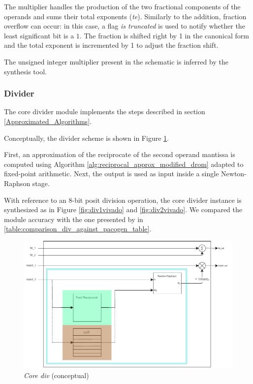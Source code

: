 The multiplier handles the production of the two fractional components of the operands and sums their total exponents (\textit{te}). Similarly to the addition, fraction overflow can occur: in this case, a flag \textit{is truncated} is used to notify whether the least significant bit is a $1$. The fraction is shifted right by 1 in the canonical form and the total exponent is incremented by 1 to adjust the fraction shift.

The unsigned integer multiplier present in the schematic is inferred by the synthesis tool. 
%





\subsubsection{Divider}\label{divider_hardware_ppu}


The core divider module implements the steps described in section \ref{Approximated_Algorithms}.

Conceptually, the divider scheme is shown in Figure \ref{fig:nr_schematic}.

First, an approximation of the reciprocate of the second operand mantissa is computed using Algorithm \ref{alg:reciprocal_approx_modified_drom} adapted to fixed-point arithmetic.
Next, the output is used as input inside a single Newton-Raphson stage.

With reference to an 8-bit posit division operation, the core divider instance is synthesized as in Figure \ref{fig:div1vivado} and \ref{fig:div2vivado}. We compared the module accuracy with the one presented by \cite{PACoGen} in \ref{table:comparison_div_against_pacogen_table}.

    \begin{figure}
        \includegraphics[width=1\textwidth]{figures/newton_raphson_drawing.drawio.pdf}
        \caption{\textit{Core div} (conceptual)}
        \label{fig:nr_schematic}
    \end{figure}

